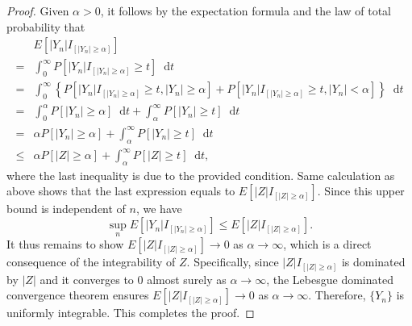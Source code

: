 \documentclass{article}
\newcommand{\dd}{\mathop{}\!\mathrm{d}}
\theoremstyle{definition}
\theoremstyle{plain}
\theoremstyle{remark}
\begin{document}
\begin{description}
\begin{proof}
Given $\alpha > 0$, it follows by the expectation formula and the law of total probability that
\begin{align*}
    & E[|Y_n|I_{[|Y_n| \geq \alpha]}] \\
    = & \int_0^\infty P[|Y_n|I_{[|Y_n| \geq \alpha]} \geq t] \dd t \\
    = & \int_0^\infty \left\{P[|Y_n|I_{[|Y_n| \geq \alpha]} \geq t, |Y_n| \geq \alpha] + 
    P[|Y_n|I_{[|Y_n| \geq \alpha]} \geq t, |Y_n| < \alpha]\right\} \dd t \\
    = & \int_0^\alpha P[|Y_n| \geq \alpha] \dd t + \int_{\alpha}^\infty P[|Y_n| \geq t] \dd t \\
    = & \alpha P[|Y_n| \geq \alpha] + \int_\alpha^\infty P[|Y_n| \geq t] \dd t \\
    \leq & \alpha P[|Z| \geq \alpha] + \int_\alpha^\infty P[|Z| \geq t] \dd t,
\end{align*}
where the last inequality is due to the provided condition. Same calculation as above 
shows that the last expression equals to $E[|Z|I_{[|Z| \geq \alpha]}]$. Since this upper
bound is independent of $n$, we have
\begin{equation*}
    \sup_n E[|Y_n|I_{[|Y_n| \geq \alpha]}] \leq E[|Z|I_{[|Z| \geq \alpha]}].
\end{equation*}
It thus remains to show $E[|Z|I_{[|Z| \geq \alpha]}] \to 0$ as $\alpha \to \infty$,
which is a direct consequence of the integrability of $Z$. Specifically, since 
$|Z|I_{[|Z| \geq \alpha]}$ is dominated by $|Z|$ and it converges to $0$ almost surely
as $\alpha \to \infty$, the Lebesgue dominated convergence theorem ensures 
$E[|Z|I_{[|Z| \geq \alpha]}] \to 0$ as $\alpha \to \infty$. Therefore, 
$\{Y_n\}$ is uniformly integrable. This completes the proof. 
\end{proof}
\end{description}

\newpage
\end{document}
